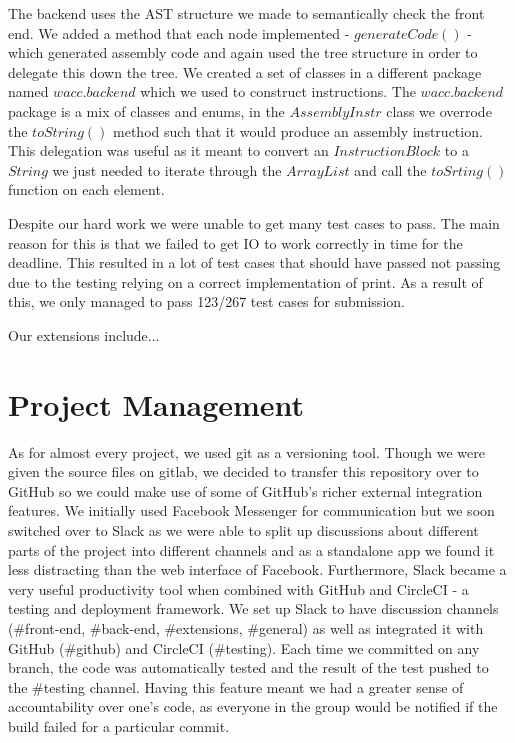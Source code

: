 \documentclass[a4paper, 11pt]{article} %
\begin{document}
The backend uses the AST structure we made to semantically check the front end. We added a method that each node implemented - $ generateCode() $ - which generated assembly code and again used the tree structure in order to delegate this down the tree. We created a set of classes in a different package named $ wacc.backend $ which we used to construct instructions. The $ wacc.backend $ package is a mix of classes and enums, in the $ AssemblyInstr $ class we overrode the $ toString() $ method such that it would produce an assembly instruction. This delegation was useful as it meant to convert an $ InstructionBlock $ to a $ String $ we just needed to iterate through the $ ArrayList $ and call the $ toSrting() $ function on each element.

Despite our hard work we were unable to get many test cases to pass. The main reason for this is that we failed to get IO to work correctly in time for the deadline. This resulted in a lot of test cases that should have passed not passing due to the testing relying on a correct implementation of print.
As a result of this, we only managed to pass 123/267 test cases for submission.

Our extensions include...


\section*{Project Management}


As for almost every project, we used git as a versioning tool. Though we were given the source files on gitlab, we decided to transfer this repository over to GitHub so we could make use of some of GitHub's richer external integration features. We initially used Facebook Messenger for communication but we soon switched over to Slack as we were able to split up discussions about different parts of the project into different channels and as a standalone app we found it less distracting than the web interface of Facebook. Furthermore, Slack became a very useful productivity tool when combined with GitHub and CircleCI - a testing and deployment framework. We set up Slack to have discussion channels (\#front-end, \#back-end, \#extensions, \#general) as well as integrated it with GitHub (\#github) and CircleCI (\#testing). Each time we committed on any branch, the code was automatically tested and the result of the test pushed to the \#testing channel. Having this feature meant we had a greater sense of accountability over one's code, as everyone in the group would be notified if the build failed for a particular commit.
\end{document}
